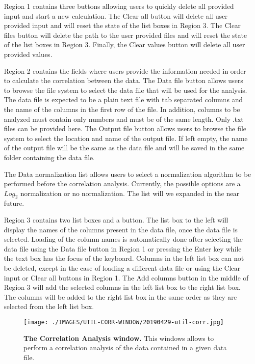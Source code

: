 Region \num{1} contains three buttons allowing users to quickly delete all provided input and start a new calculation. The Clear all button will delete all user provided input and will reset the state of the list boxes in Region \num{3}. The Clear files button will delete the path to the user provided files and will reset the state of the list boxes in Region \num{3}. Finally, the Clear values button will delete all user provided values.

Region \num{2} contains the fields where users provide the information needed in order to calculate the correlation between the data. The Data file button allows users to browse the file system to select the data file that will be used for the analysis. The data file is expected to be a plain text file with tab separated columns and the name of the columns in the first row of the file. In addition, columns to be analyzed must contain only numbers and must be of the same length. Only .txt files can be provided here. The Output file button allows users to browse the file system to select the location and name of the output file. If left empty, the name of the output file will be the same as the data file and will be saved in the same folder containing the data file. 

The Data normalization list allows users to select a normalization algorithm to be performed before the correlation analysis. Currently, the possible options are a $Log_{2}$ normalization or no normalization. The list will we expanded in the near future.

Region \num{3} contains two list boxes and a button. The list box to the left will display the names of the columns present in the data file, once the data file is selected. Loading of the column names is automatically done after selecting the data file using the Data file button in Region \num{1} or pressing the Enter key while the text box has the focus of the keyboard. Columns in the left list box can not be deleted, except in the case of loading a different data file or using the Clear input or Clear all buttons in Region \num{1}. The Add columns button in the middle of Region \num{3} will add the selected columns in the left list box to the right list box. The columns will be added to the right list box in the same order as they are selected from the left list box. 

\begin{figure}[h]
	\centering
	\texttt{[image: ./IMAGES/UTIL-CORR-WINDOW/20190429-util-corr.jpg]}	    
	\caption[The Correlation Analysis window]{\textbf{The Correlation Analysis window.} This windows allows to perform a correlation analysis of the data contained in a given data file.} 
	\label{fig:corranalyset}
	\vspace{-5pt} 	
\end{figure}

